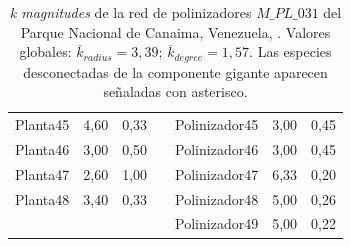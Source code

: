 \begin{table}[htbp]
\begin{tabular}{lrrrlrr}
    Planta45 & 4,60 & 0,33 &      & Polinizador45 & 3,00 & 0,45 \\
    Planta46 & 3,00 & 0,50 &      & Polinizador46 & 3,00 & 0,45 \\
    Planta47 & 2,60 & 1,00 &      & Polinizador47 & 6,33 & 0,20 \\
    Planta48 & 3,40 & 0,33 &      & Polinizador48 & 5,00 & 0,26 \\
         &      &      &      & Polinizador49 & 5,00 & 0,22 \\
    \bottomrule
    \end{tabular}%
    \caption{\label{table:kmag_pl_031} \textit{k magnitudes} de la red  de polinizadores $M\_PL\_031$ del Parque Nacional de Canaima, Venezuela, \cite{ramirez1989biologia}. Valores globales: $\overline k_{radius} = 3,39$; $\overline k_{degree} = 1,57$. Las especies desconectadas de la componente gigante aparecen señaladas con asterisco.}
\end{table}%